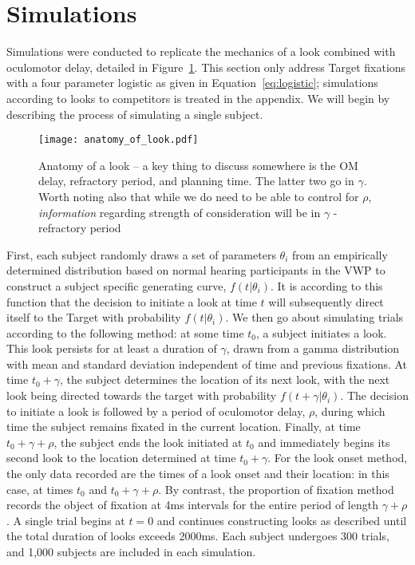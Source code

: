 \section{Simulations}

Simulations were conducted to replicate the mechanics of a look combined with oculomotor delay, detailed in Figure~\ref{fig:anatomy_of_look}. This section only address Target fixations with a four parameter logistic as given in Equation~\ref{eq:logistic}; simulations according to looks to competitors is treated in the appendix. We will begin by describing the process of simulating a single subject.

\begin{figure}[H]
\centering
\texttt{[image: anatomy\_of\_look.pdf]}
\caption{Anatomy of a look -- a key thing to discuss somewhere is the OM delay, refractory period, and planning time. The latter two go in $\gamma$. Worth noting also that while we do need to be able to control for $\rho$, \textit{information} regarding strength of consideration will be in $\gamma$ - refractory period}
\label{fig:anatomy_of_look}
\end{figure}


First, each subject randomly draws a set of parameters $\theta_i$ from an empirically determined distribution based on normal hearing participants in the VWP \cite{FarrisTrimble2014} to construct a subject specific generating curve, $f(t | \theta_i)$.   It is according to this function that the decision to initiate a look at time $t$ will subsequently direct itself to the Target with probability $f(t|\theta_i)$. We then go about simulating trials according to the following method: at some time $t_0$, a subject initiates a look. This look persists for at least a duration of $\gamma$, drawn from a gamma distribution with mean and standard deviation independent of time and previous fixations. At time $t_0+\gamma$, the subject determines the location of its next look, with the next look being directed towards the target with probability $f(t+\gamma | \theta_i)$. The decision to initiate a look is followed by a period of oculomotor delay, $\rho$, during which time the subject remains fixated in the current location. Finally, at time $t_0 + \gamma + \rho$, the subject ends the look initiated at $t_0$ and immediately begins its second look to the location determined at time $t_0 + \gamma$. For the look onset method, the only data recorded are the times of a look onset and their location: in this case, at times $t_0$ and $t_0 + \gamma + \rho$. By contrast, the proportion of fixation method records the object of fixation at 4ms intervals for the entire period of length $\gamma + \rho$. A single trial begins at $t = 0$ and continues constructing looks as described until the total duration of looks exceeds 2000ms. Each subject undergoes 300 trials, and 1,000 subjects are included in each simulation.

